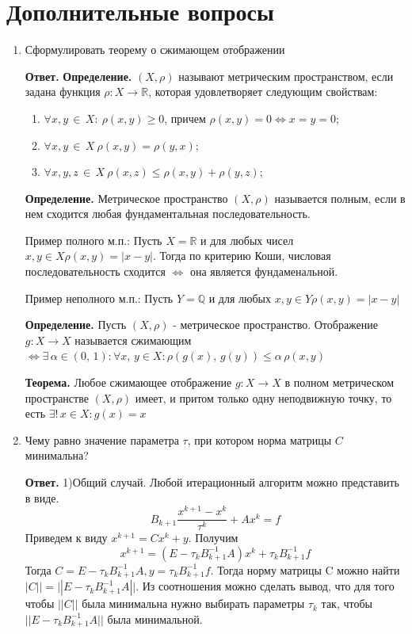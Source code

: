 \documentclass{article}
\begin{document}
    \section{Дополнительные вопросы}
    \begin{enumerate}
        \item Сформулировать теорему о сжимающем отображении
        
        {\bfseries Ответ. }
    {\bfseries Определение. } $(X, \rho)$ называют метрическим пространством, если задана функция 
    $\rho: X \rightarrow \mathbb{R}$, которая удовлетворяет следующим свойствам: 
    \begin{enumerate}
        \item $\forall x, y\,  \in\, X: \  \rho(x,y) \geqslant 0$, причем $\rho(x,y) = 0 \Leftrightarrow x = y = 0$;
        \item $\forall x, y \, \in \, X \  \rho(x,y) = \rho(y,x)$;
        \item $\forall x, y, z \, \in \, X \ \rho(x,z) \leqslant \rho(x,y) + \rho(y,z)$;
    \end{enumerate}
    
    {\bfseries Определение. } Метрическое пространство $(X, \rho)$ называется полным, если в нем сходится любая 
    фундаментальная последовательность.

    Пример полного м.п.: 
    Пусть $X = \mathbb{R}$ и для любых чисел $x, y \in X \rho(x,y) = |x-y|$. Тогда по критерию
    Коши, числовая последовательность сходится $\Leftrightarrow$ она является фундаменальной.
    
    Пример неполного м.п.: 
    Пусть $Y = \mathbb{Q}$ и для любых $x, y \in Y \rho (x,y) = |x-y| $


        {\bfseries Определение. } Пусть $(X, \rho)$ - метрическое пространство. Отображение 
        $g : X \rightarrow X$ называется сжимающим $\Leftrightarrow \exists \, \alpha \in (0,\, 1): \forall x, \, y \in X: \rho(g(x),\,g(y)) \leqslant \alpha \,\rho(x,y)$ 
        


        {\bfseries Теорема. } Любое сжимающее отображение $g: X \rightarrow X$ в полном 
        метрическом пространстве $(X, \rho)$ имеет, и притом только одну неподвижную точку, то есть 
        $\exists!\, x\in X: g(x) = x$ 
        \item Чему равно значение параметра $\tau$, при котором норма матрицы $C$ минимальна?
        
        {\bfseries Ответ. }
        1)Общий случай. Любой итерационный алгоритм можно представить в виде.
	\[
	B_{k+1} \frac{x^{k+1}-x^k}{\tau ^k}+Ax^k=f
	\]
	Приведем к виду $x^{k+1} = Cx^k +y$. Получим
	\[
	x^{k+1} = (E - \tau_k B_{k+1}^{-1}A)x^k + \tau_k B_{k+1}^{-1}f
	\]
	Тогда $C = E - \tau_k B_{k+1}^{-1}A, y =\tau_k B_{k+1}^{-1}f$. Тогда норму матрицы C можно найти $|C|| = ||E - \tau_k B_{k+1}^{-1}A||$. Из соотношения можно сделать вывод, что для того чтобы $||C||$ была минимальна нужно выбирать параметры $\tau_k$ так, чтобы $||E - \tau_k B_{k+1}^{-1}A||$ была минимальной.
	

\end{enumerate}
\end{document}
